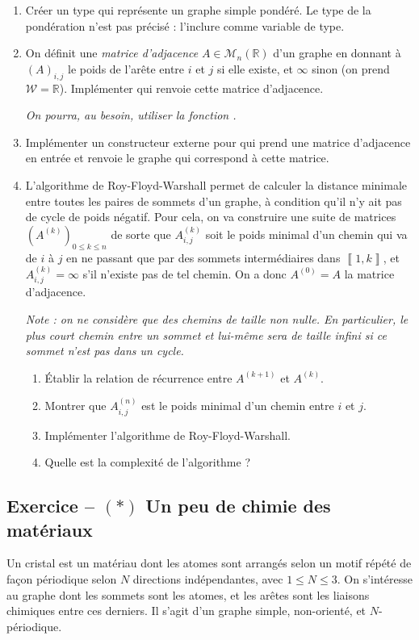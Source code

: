 \documentclass{article}
\newcounter{loop}
\newcounter{numEx}
\newcommand{\exo}[1]{
	\stepcounter{numEx}
	\setcounter{loop}{0}
	\subsection*{Exercice \arabic{numEx} -- #1}
}
\newcommand{\llbra}{\left\llbracket}
\newcommand{\rrbra}{\right\rrbracket}
\renewcommand{\brack}[1]{\ensuremath{\llbra#1\rrbra}}
\newcommand{\der}[2]{#1^{\ensuremath{\left(#2\right)}}}
\newcommand{\paren}[1]{\ensuremath{\left(#1\right)}}
\newcommand{\matr}[2]{\mathcal{M}_{#1}\paren{#2}}
\newcommand{\R}{\mathbb{R}}
\begin{document}
\begin{enumerate}
	\item Créer un type  qui représente un graphe simple pondéré. Le type de la pondération n'est pas précisé : l'inclure comme variable de type.

	\item On définit une \emph{matrice d'adjacence} $A\in\matr n\R$ d'un graphe en donnant à $(A)_{i,j}$ le poids de l'arête entre $i$ et $j$ si elle existe, et $\infty$ sinon (on prend $\mathcal W = \R$). Implémenter  qui renvoie cette matrice d'adjacence.

	\textsl{On pourra, au besoin, utiliser la fonction .}

	\item Implémenter un constructeur externe pour  qui prend une matrice d'adjacence en entrée et renvoie le graphe qui correspond à cette matrice.

	\item L'algorithme de Roy-Floyd-Warshall permet de calculer la distance minimale entre toutes les paires de sommets d'un graphe, à condition qu'il n'y ait pas de cycle de poids négatif. Pour cela, on va construire une suite de matrices $\paren{\der Ak}_{0\le k\le n}$ de sorte que $\der Ak_{i,j}$ soit le poids minimal d'un chemin qui va de $i$ à $j$ en ne passant que par des sommets intermédiaires dans $\brack{1,k}$, et $\der Ak_{i,j} = \infty$ s'il n'existe pas de tel chemin. On a donc $\der A0 = A$ la matrice d'adjacence.

	\textit{Note : on ne considère que des chemins de taille non nulle. En particulier, le plus court chemin entre un sommet et lui-même sera de taille infini si ce sommet n'est pas dans un cycle.}
	\begin{enumerate}
		\item Établir la relation de récurrence entre $\der A{k+1}$ et $\der Ak$.
		\item Montrer que $\der An_{i,j}$ est le poids minimal d'un chemin entre $i$ et $j$.
		\item Implémenter l'algorithme de Roy-Floyd-Warshall.
		\item Quelle est la complexité de l'algorithme ?
	\end{enumerate}
\end{enumerate}


\exo{$(*)$ Un peu de chimie des matériaux}

Un cristal est un matériau dont les atomes sont arrangés selon un motif répété de façon périodique selon $N$ directions indépendantes, avec $1\le N\le3$. On s'intéresse au graphe dont les sommets sont les atomes, et les arêtes sont les liaisons chimiques entre ces derniers. Il s'agit d'un graphe simple, non-orienté, et $N$-périodique.
\end{document}
